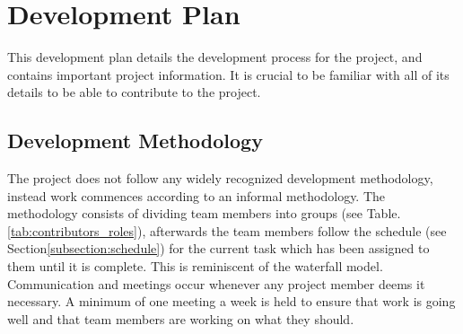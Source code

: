 \section{Development Plan}
\label{section:development_plan}

This development plan details the development process for the project, and contains important project information. It is crucial to be familiar with all of its details to be able to contribute to the project.



\subsection{Development Methodology}

The project does not follow any widely recognized development methodology, instead work commences according to an informal methodology. The methodology consists of dividing team members into groups (see Table.\:\ref{tab:contributors_roles}), afterwards the team members follow the schedule (see Section\:\ref{subsection:schedule}) for the current task which has been assigned to them until it is complete. This is reminiscent of the waterfall model. Communication and meetings occur whenever any project member deems it necessary. A minimum of one meeting a week is held to ensure that work is going well and that team members are working on what they should.



